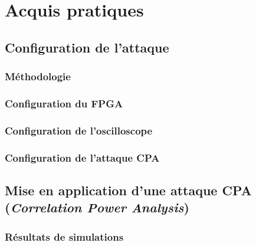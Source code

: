 \documentclass[oneside]{book}
\begin{document}
\newpage



\part{Acquis pratiques}


\chapter{Configuration de l'attaque}
\label{chap:config}

\section{Méthodologie}
\label{sec:Introduction}

\section{Configuration du FPGA}
\label{sec:Introduction}

\section{Configuration de l'oscilloscope}
\label{sec:Introduction}

\section{Configuration de l'attaque CPA}
\label{sec:Introduction}

\newpage


\chapter{Mise en application d'une attaque CPA (\textit{Correlation Power Analysis})}

\section{Résultats de simulations}
\label{sec:Introduction}
\end{document}
